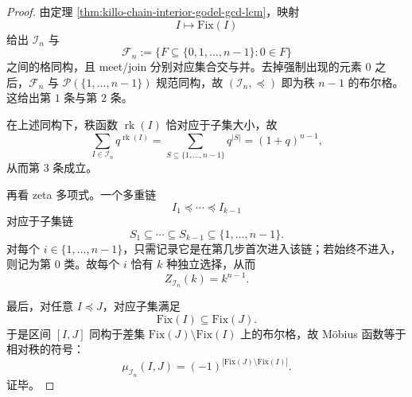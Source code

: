 \begin{proof}
由定理 \ref{thm:killo-chain-interior-godel-gcd-lcm}，映射
\[
I\longmapsto \mathrm{Fix}(I)
\]
给出 \(\mathcal I_n\) 与
\[
\mathcal F_n:=\{F\subseteq \{0,1,\dots,n-1\}:0\in F\}
\]
之间的格同构，且 meet/join 分别对应集合交与并。去掉强制出现的元素 \(0\) 之后，\(\mathcal F_n\) 与 \(\mathcal P(\{1,\dots,n-1\})\) 规范同构，故 \((\mathcal I_n,\preceq)\) 即为秩 \(n-1\) 的布尔格。这给出第 \(1\) 条与第 \(2\) 条。

在上述同构下，秩函数 \(\operatorname{rk}(I)\) 恰对应于子集大小，故
\[
\sum_{I\in\mathcal I_n}q^{\operatorname{rk}(I)}
=
\sum_{S\subseteq\{1,\dots,n-1\}}q^{|S|}
=(1+q)^{n-1},
\]
从而第 \(3\) 条成立。

再看 zeta 多项式。一个多重链
\[
I_1\preceq\cdots\preceq I_{k-1}
\]
对应于子集链
\[
S_1\subseteq \cdots\subseteq S_{k-1}\subseteq \{1,\dots,n-1\}.
\]
对每个 \(i\in\{1,\dots,n-1\}\)，只需记录它是在第几步首次进入该链；若始终不进入，则记为第 \(0\) 类。故每个 \(i\) 恰有 \(k\) 种独立选择，从而
\[
Z_{\mathcal I_n}(k)=k^{n-1}.
\]

最后，对任意 \(I\preceq J\)，对应子集满足
\[
\mathrm{Fix}(I)\subseteq \mathrm{Fix}(J).
\]
于是区间 \([I,J]\) 同构于差集 \(\mathrm{Fix}(J)\setminus \mathrm{Fix}(I)\) 上的布尔格，故 Möbius 函数等于相对秩的符号：
\[
\mu_{\mathcal I_n}(I,J)=(-1)^{|\mathrm{Fix}(J)\setminus \mathrm{Fix}(I)|}.
\]
证毕。
\end{proof}

